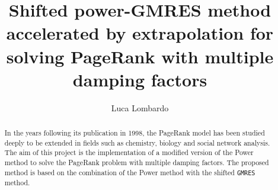 \documentclass[11pt]{article}
\title{Shifted power-GMRES method accelerated by extrapolation
for solving PageRank with multiple damping factors}
\author{Luca Lombardo}
\date{}
\begin{document}
\maketitle

\begin{abstract}
    \noindent In the years following its publication in 1998, the PageRank model has been studied deeply to be extended in fields such as chemistry, biology and social network analysis. The aim of this project is the implementation of a modified version of the Power method to solve the PageRank problem with multiple damping factors. The proposed method is based on the combination of the Power method with the shifted \texttt{GMRES} method.

\end{abstract}
\tableofcontents
\clearpage






\clearpage


\nocite{*}
\end{document}
